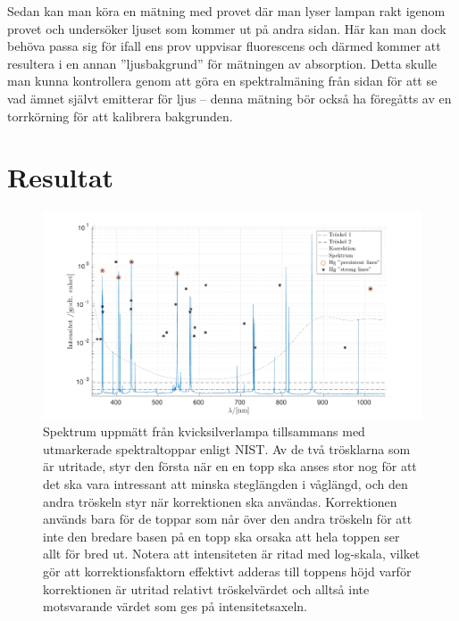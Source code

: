 \documentclass[11pt,a4paper]{article}
\begin{document}
Sedan kan man köra en mätning med provet där man lyser lampan rakt igenom provet och undersöker ljuset som kommer ut på andra sidan. Här kan man dock behöva passa sig för ifall ens prov uppvisar fluorescens och därmed kommer att resultera i en annan ''ljusbakgrund'' för mätningen av absorption\cite{flour_spec}. Detta skulle man kunna kontrollera genom att göra en spektralmäning från sidan för att se vad ämnet självt emitterar för ljus -- denna mätning bör också ha föregåtts av en torrkörning för att kalibrera bakgrunden.




\section{Resultat}


\begin{figure}\centering
\centerline{ %
\includegraphics[width=1.2\textwidth]{Hg_spektrum.pdf}
}
\caption{Spektrum uppmätt från kvicksilverlampa tillsammans med utmarkerade spektraltoppar enligt NIST\cite{NIST}. Av de två trösklarna som är utritade, styr den första när en en topp ska anses stor nog för att det ska vara intressant att minska steglängden i våglängd, och den andra tröskeln styr när korrektionen ska användas. Korrektionen används bara för de toppar som når över den andra tröskeln för att inte den bredare basen på en topp ska orsaka att hela toppen ser allt för bred ut. Notera att intensiteten är ritad med log-skala, vilket gör att korrektionsfaktorn effektivt adderas till toppens höjd varför korrektionen är utritad relativt tröskelvärdet och alltså inte motsvarande värdet som ges på intensitetsaxeln.
}
\label{fig:Hg_spektrum} 
\end{figure}
\restoregeometry
\end{document}
